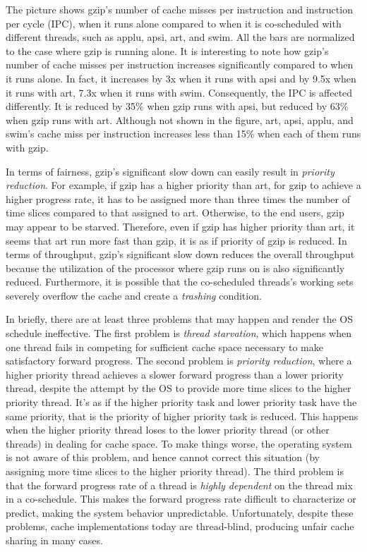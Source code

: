 The picture shows gzip's number of cache misses per instruction and instruction per cycle (IPC), when it runs alone compared to when it is
co-scheduled with different threads, such as applu, apsi, art, and swim. All the bars are normalized to the case where gzip is running alone.
It is interesting to note how gzip's number of cache misses per instruction increases significantly compared to when it runs alone. In fact, it increases 
by 3x when it runs with apsi and by 9.5x when it runs with art, 7.3x when it runs with swim.
Consequently, the IPC is affected differently. It is reduced by 35$\%$ when gzip runs with apsi, but reduced by 63$\%$ when gzip runs with art. 
Although not shown in the figure, art, apsi, applu, and swim's cache miss per instruction increases less than 15$\%$ when each of them runs with gzip. 

In terms of fairness, gzip's significant slow down can easily result in \textit{priority reduction}. 
For example, if gzip has a higher priority than art, for gzip to achieve a higher progress rate, it has to be assigned more than three times the 
number of time slices compared to that assigned to art. Otherwise, to the end users, gzip may appear to be starved. Therefore, even if gzip has higher 
priority than art, it seems that art run more fast than gzip, it is as if priority of gzip is reduced. In terms of throughput,
gzip's significant slow down reduces the overall throughput because the utilization of the processor where gzip runs on is also significantly reduced. 
Furthermore, it is possible that the co-scheduled threads's working sets severely overflow the cache and create a \textit{trashing} condition.

In briefly, there are at least three problems that may happen and render the OS schedule ineffective.
The first problem is \textit{thread starvation}, which happens when one thread fails in competing for sufficient cache space necessary to make 
satisfactory forward progress. The second problem is \textit{priority reduction}, where a higher priority thread achieves a slower forward
progress than a lower priority thread, despite the attempt by the OS to provide more time slices to the higher priority thread. It's as if the higher 
priority task and lower priority task have the same priority, that is the priority of higher priority task is reduced.
This happens when the higher priority thread loses to the lower priority thread (or other threads) in dealing for cache space. 
To make things worse, the operating system is not aware of this problem, and hence cannot correct this situation (by assigning more time slices to the 
higher priority thread). The third problem is that the forward progress rate of a thread is \textit{highly dependent} on the thread mix in a co-schedule. 
This makes the forward progress rate difficult to characterize or predict, making the system behavior unpredictable. Unfortunately, despite these problems, 
cache implementations today are thread-blind, producing unfair cache sharing in many cases.

